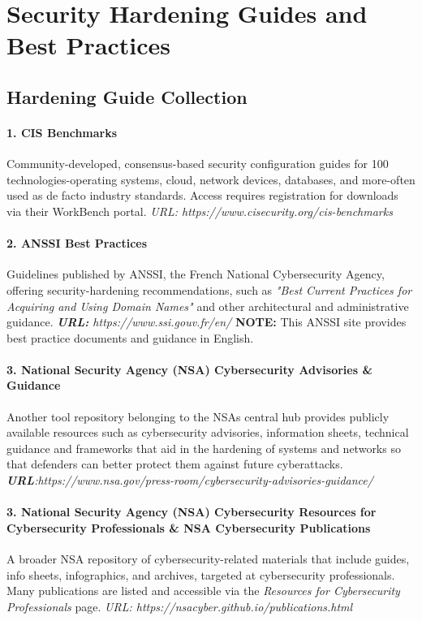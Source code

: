\chapter{Security Hardening Guides and Best Practices}

\section{Hardening Guide Collection}

\subsubsection{1. CIS Benchmarks}
Community-developed, consensus-based security configuration guides for 100 technologies-operating systems, cloud, network devices, databases, and more-often used as de facto industry standards. Access requires registration for downloads via their WorkBench portal.
\textit{URL: https://www.cisecurity.org/cis-benchmarks}  

\subsubsection{2. ANSSI Best Practices}
Guidelines published by ANSSI, the French National Cybersecurity Agency, offering security-hardening recommendations, such as \textit{"Best Current Practices for Acquiring and Using Domain Names"} and other architectural and administrative guidance.
\textit{\textbf{URL:} https://www.ssi.gouv.fr/en/ }
\textbf{NOTE:} This ANSSI site provides best practice documents and guidance in English.

\subsubsection{3. National Security Agency (NSA) Cybersecurity Advisories \& Guidance}
Another tool repository belonging to the NSAs central hub provides publicly available resources such as cybersecurity advisories, information sheets, technical guidance and frameworks that aid in the hardening of systems and networks so that defenders can better protect them against future cyberattacks.
\textit{\textbf{URL}:https://www.nsa.gov/press-room/cybersecurity-advisories-guidance/  }

\subsubsection{3. National Security Agency (NSA) Cybersecurity Resources for Cybersecurity Professionals \& NSA Cybersecurity Publications}
A broader NSA repository of cybersecurity-related materials that include guides, info sheets, infographics, and archives, targeted at cybersecurity professionals. Many publications are listed and accessible via the \textit{Resources for Cybersecurity Professionals} page.
\textit{URL: https://nsacyber.github.io/publications.html}  

